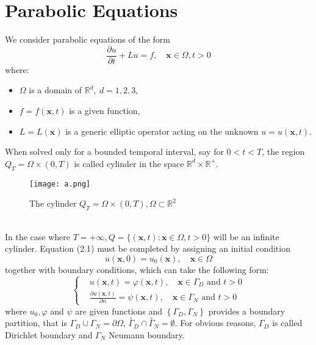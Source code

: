 \documentclass[11pt]{book}
\begin{document}
\section*{Parabolic Equations}
We consider parabolic equations of the form
\begin{equation}
\frac{\partial u}{\partial t}+L u=f, \quad \mathbf{x} \in \Omega, t>0
\end{equation}
where:
\begin{itemize}
\item $\Omega$ is a domain of $\mathbb{R}^{d}, \  d=1,2,3$,
\item $f=f(\mathbf{x}, t)$ is a given function,
\item $L=L(\mathbf{x})$ is a generic elliptic operator acting on the unknown $u=u(\mathbf{x}, t)$.
\end{itemize}
When solved only for a bounded temporal interval, say for $0<t<T$, the region $Q_{T}=\Omega \times(0, T)$ is called cylinder in the space $\mathbb{R}^{d} \times \mathbb{R}^{+}$.
\begin{figure}[h]
\centering
\texttt{[image: a.png]}
\caption{The cylinder $Q_{T}=\Omega \times(0, T), \Omega \subset \mathbb{R}^{2}$}
\end{figure} \\
In the case where $T=+\infty, Q=\{(\mathbf{x}, t): \mathbf{x} \in \Omega, t>0\}$ will be an infinite cylinder.
Equation (2.1) must be completed by assigning an initial condition
\begin{equation}
u(\mathbf{x}, 0)=u_{0}(\mathbf{x}), \quad \mathbf{x} \in \Omega
\end{equation}
together with boundary conditions, which can take the following form:
\begin{equation}
\left\{
\begin{aligned}
& u(\mathbf{x}, t)=\varphi(\mathbf{x}, t), \quad \mathbf{x} \in \Gamma_{D} \text { and } t>0 \\
& \frac{\partial u(\mathbf{x}, t)}{\partial n}=\psi(\mathbf{x}, t), \quad \mathbf{x} \in \Gamma_{N} \text { and } t>0 \label{eq:second}
\end{aligned}
\right.
\end{equation}
where $u_{0}, \varphi$ and $\psi$ are given functions and $\left\{\Gamma_{D}, \Gamma_{N}\right\}$ provides a boundary partition, that is $\Gamma_{D} \cup \Gamma_{N}=\partial \Omega$, $\stackrel{\circ}{\Gamma}_{D} \cap \stackrel{\circ}{\Gamma}_{N}=\emptyset$. For obvious reasons, $\Gamma_{D}$ is called Dirichlet boundary and $\Gamma_{N}$ Neumann boundary.
\end{document}
